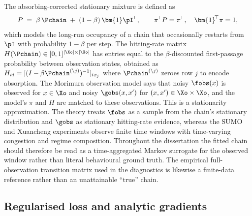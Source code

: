 The absorbing-corrected stationary mixture is defined as
\begin{equation}
P \;=\; \beta\,\Pchain \;+\; (1-\beta)\,\bm{1}\pI^{\!\top},
\qquad
\pi^{\!\top} P = \pi^{\!\top}, \quad \bm{1}^{\!\top}\pi = 1,
\label{eq:stationary}
\end{equation}
which models the long-run occupancy of a chain that occasionally restarts
from $\pI$ with probability $1-\beta$ per step. The hitting-rate matrix
$H(\Pchain) \in [0,1]^{|\Xo|\times|\Xo|}$ has entries equal to the
$\beta$-discounted first-passage probability between observation states,
obtained as $H_{ij} = [(I - \beta\Pchain^{(\setminus j)})^{-1}]_{ix_j}$
where $\Pchain^{(\setminus j)}$ zeroes row $j$ to encode absorption.
The Morimura observation model says that noisy $\fobs(x)$ is observed for
$x \in \Xo$ and noisy $\gobs(x, x')$ for $(x, x') \in \Xo \times \Xo$,
and the model's $\pi$ and $H$ are matched to these observations.
This is a stationarity approximation. The theory treats $\fobs$ as a
sample from the chain's stationary distribution and $\gobs$ as stationary
hitting-rate evidence, whereas the SUMO and Xuancheng experiments observe
finite time windows with time-varying congestion and regime composition.
Throughout the dissertation the fitted chain should therefore be read as
a time-aggregated Markov surrogate for the observed window rather than
literal behavioural ground truth. The empirical full-observation transition
matrix used in the diagnostics is likewise a finite-data reference rather
than an unattainable ``true'' chain.

\subsection{Regularised loss and analytic gradients}
\label{sec:loss-gradients}

